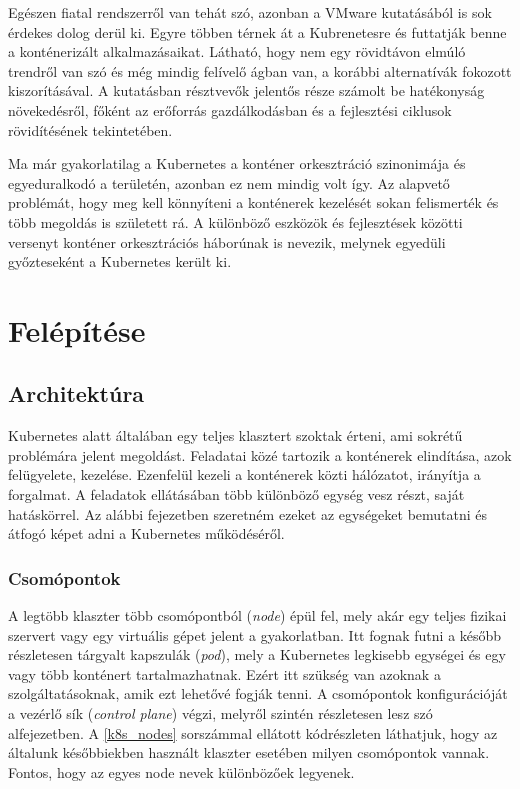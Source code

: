 Egészen fiatal rendszerről van tehát szó, azonban a VMware kutatásából\citep{VMwareSurvey} is sok érdekes dolog derül ki.
Egyre többen térnek át a Kubrenetesre és futtatják benne a konténerizált alkalmazásaikat. 
Látható, hogy nem egy rövidtávon elmúló trendről van szó és még mindig felívelő ágban van, a korábbi alternatívák fokozott kiszorításával.
A kutatásban résztvevők jelentős része számolt be hatékonyság növekedésről, főként az erőforrás gazdálkodásban és a fejlesztési ciklusok rövidítésének tekintetében.

Ma már gyakorlatilag a Kubernetes a konténer orkesztráció szinonimája és egyeduralkodó a területén, azonban ez nem mindig volt így.
Az alapvető problémát, hogy meg kell könnyíteni a konténerek kezelését sokan felismerték és több megoldás is született rá. 
A különböző eszközök és fejlesztések közötti versenyt konténer orkesztrációs háborúnak is nevezik\citep{containerOrchestrationWar}, melynek egyedüli győzteseként a Kubernetes került ki.

\section{Felépítése}

\subsection{Architektúra}
Kubernetes alatt általában egy teljes klasztert szoktak érteni, ami sokrétű problémára jelent megoldást.
Feladatai közé tartozik a konténerek elindítása, azok felügyelete, kezelése. 
Ezenfelül kezeli a konténerek közti hálózatot, irányítja a forgalmat.
A feladatok ellátásában több különböző egység vesz részt, saját hatáskörrel. 
Az alábbi fejezetben szeretném ezeket az egységeket bemutatni és átfogó képet adni a Kubernetes működéséről.  

\subsubsection{Csomópontok}
A legtöbb klaszter több csomópontból (\textit{node}) épül fel, mely akár egy teljes fizikai szervert vagy egy virtuális gépet jelent a gyakorlatban.
Itt fognak futni a később részletesen tárgyalt kapszulák (\textit{pod}), mely a Kubernetes legkisebb egységei és egy vagy több konténert tartalmazhatnak.
Ezért itt szükség van azoknak a szolgáltatásoknak, amik ezt lehetővé fogják tenni.
A csomópontok konfigurációját a vezérlő sík (\textit{control plane}) végzi, melyről szintén részletesen lesz szó  alfejezetben.
A \ref{k8s_nodes} sorszámmal ellátott kódrészleten láthatjuk, hogy az általunk későbbiekben használt klaszter esetében milyen csomópontok vannak.
Fontos, hogy az egyes node nevek  különbözőek legyenek. 

